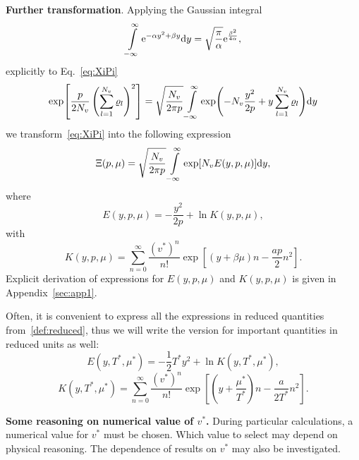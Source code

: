 \documentclass[12pt]{article}
\numberwithin{equation}{section}
\begin{document}
	\textbf{Further transformation}. Applying the Gaussian integral
	\begin{equation}
		\int\limits_{-\infty}^{\infty} {\rm e}^{-\alpha y^2 + \beta y} {\rm d}y = \sqrt{\frac{\pi}{\alpha}} {\rm e}^{\frac{\beta^2}{4\alpha}},
	\end{equation}
	explicitly to Eq.~\eqref{eq:XiPi}
	\begin{equation}
		\label{eq:gaussInt}
		\exp[\frac{p}{2N_v}\left(\sum_{l=1}^{N_v} \varrho_l\right)^2] = \sqrt{\frac{N_v}{2\pi p}}
		\int\limits_{-\infty}^{\infty} \exp(-N_v \frac{y^2}{2p} + y\sum_{l=1}^{N_v} \varrho_l) {\rm d}y
	\end{equation}
	we transform~\eqref{eq:XiPi} into the following expression
	\begin{equation}
		\label{eq:XiInty}
		\Xi (p, \mu) = \sqrt{\frac{N_v}{2\pi p}} \int\limits_{-\infty}^{\infty} \exp[N_v E(y, p, \mu)] {\rm d} y,
	\end{equation}
	where 
	\begin{equation}
		\label{def:E}
		E(y,p,\mu) = -\frac{y^2}{2p} + \ln K(y,p,\mu),
	\end{equation}
	with
	\begin{equation}
		\label{def:K}
		K(y,p,\mu) = \sum_{n=0}^{\infty} \frac{(v^*)^n}{n!} \exp[(y+\beta\mu)n - \frac{ap}{2}n^2].
	\end{equation}
	Explicit derivation of expressions for $E(y,p,\mu)$ and $K(y,p,\mu)$ is given in Appendix~\ref{sec:app1}.
	
	\begin{mdframed}[linecolor=black,linewidth=1pt,leftline=true]
	Often, it is convenient to express all the expressions in reduced quantities from~\eqref{def:reduced}, thus we will write the version for important quantities in reduced units as well:
	\begin{equation}
		E(y,T^*,\mu^*) = -\frac{1}{2}T^* y^2 + \ln K(y, T^*, \mu^*),
	\end{equation}
	\begin{equation}
		K(y,T^*,\mu^*) = \sum_{n=0}^{\infty} \frac{(v^*)^n}{n!} \exp[\left(y+\frac{\mu^*}{T^*}\right)n - \frac{a}{2T^*}n^2].
	\end{equation}
	\end{mdframed}
	
	\textbf{Some reasoning on numerical value of $v^*$.} During particular calculations, a numerical value for $v^*$ must be chosen. Which value to select may depend on physical reasoning. The dependence of results on $v^*$ may also be investigated.
	
\end{document}
